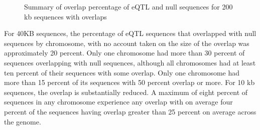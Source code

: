 \documentclass[12pt]{article}
\begin{document}
\begin{figure}[!htbp]%
\centering
{}%
\qquad
{} 
\caption{Summary of overlap percentage of eQTL and null sequences for 200 kb sequences with overlaps}
\label{fig: 100kbOverlaps} 
\end{figure}  


For 40KB sequences, the percentage of eQTL sequences that overlapped with null sequences by chromosome, with no account taken on the size of the overlap 
was approximately 20 percent. Only one chromosome had more than 30 percent of sequences overlapping with null sequences, although all chromosomes had at least ten percent of their sequences with some overlap. Only one chromosome had more than 15 percent of its sequences with 50 percent overlap or more. For 10 kb sequences, the overlap is substantially reduced. A maximum of eight percent of sequences in any chromosome experience any overlap with on average 
four percent of the sequences having overlap greater than 25 percent on average across the genome.
\end{document}
